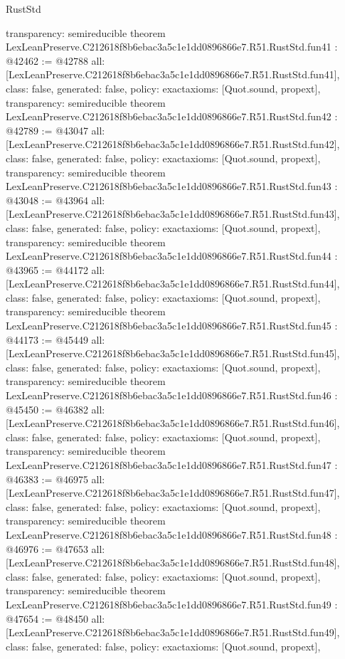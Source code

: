 \begin{lexlean}{RustStd}
\begin{coremodule}
{  transparency: semireducible
}
theorem LexLeanPreserve.C212618f8b6ebac3a5c1e1dd0896866e7.R51.RustStd.fun41 : @42462 := @42788 {
  all: [LexLeanPreserve.C212618f8b6ebac3a5c1e1dd0896866e7.R51.RustStd.fun41],
  class: false,
  generated: false,
  policy: exact{axioms: [Quot.sound, propext]},
  transparency: semireducible
}
theorem LexLeanPreserve.C212618f8b6ebac3a5c1e1dd0896866e7.R51.RustStd.fun42 : @42789 := @43047 {
  all: [LexLeanPreserve.C212618f8b6ebac3a5c1e1dd0896866e7.R51.RustStd.fun42],
  class: false,
  generated: false,
  policy: exact{axioms: [Quot.sound, propext]},
  transparency: semireducible
}
theorem LexLeanPreserve.C212618f8b6ebac3a5c1e1dd0896866e7.R51.RustStd.fun43 : @43048 := @43964 {
  all: [LexLeanPreserve.C212618f8b6ebac3a5c1e1dd0896866e7.R51.RustStd.fun43],
  class: false,
  generated: false,
  policy: exact{axioms: [Quot.sound, propext]},
  transparency: semireducible
}
theorem LexLeanPreserve.C212618f8b6ebac3a5c1e1dd0896866e7.R51.RustStd.fun44 : @43965 := @44172 {
  all: [LexLeanPreserve.C212618f8b6ebac3a5c1e1dd0896866e7.R51.RustStd.fun44],
  class: false,
  generated: false,
  policy: exact{axioms: [Quot.sound, propext]},
  transparency: semireducible
}
theorem LexLeanPreserve.C212618f8b6ebac3a5c1e1dd0896866e7.R51.RustStd.fun45 : @44173 := @45449 {
  all: [LexLeanPreserve.C212618f8b6ebac3a5c1e1dd0896866e7.R51.RustStd.fun45],
  class: false,
  generated: false,
  policy: exact{axioms: [Quot.sound, propext]},
  transparency: semireducible
}
theorem LexLeanPreserve.C212618f8b6ebac3a5c1e1dd0896866e7.R51.RustStd.fun46 : @45450 := @46382 {
  all: [LexLeanPreserve.C212618f8b6ebac3a5c1e1dd0896866e7.R51.RustStd.fun46],
  class: false,
  generated: false,
  policy: exact{axioms: [Quot.sound, propext]},
  transparency: semireducible
}
theorem LexLeanPreserve.C212618f8b6ebac3a5c1e1dd0896866e7.R51.RustStd.fun47 : @46383 := @46975 {
  all: [LexLeanPreserve.C212618f8b6ebac3a5c1e1dd0896866e7.R51.RustStd.fun47],
  class: false,
  generated: false,
  policy: exact{axioms: [Quot.sound, propext]},
  transparency: semireducible
}
theorem LexLeanPreserve.C212618f8b6ebac3a5c1e1dd0896866e7.R51.RustStd.fun48 : @46976 := @47653 {
  all: [LexLeanPreserve.C212618f8b6ebac3a5c1e1dd0896866e7.R51.RustStd.fun48],
  class: false,
  generated: false,
  policy: exact{axioms: [Quot.sound, propext]},
  transparency: semireducible
}
theorem LexLeanPreserve.C212618f8b6ebac3a5c1e1dd0896866e7.R51.RustStd.fun49 : @47654 := @48450 {
  all: [LexLeanPreserve.C212618f8b6ebac3a5c1e1dd0896866e7.R51.RustStd.fun49],
  class: false,
  generated: false,
  policy: exact{axioms: [Quot.sound, propext]},
}
\end{coremodule}
\end{lexlean}
